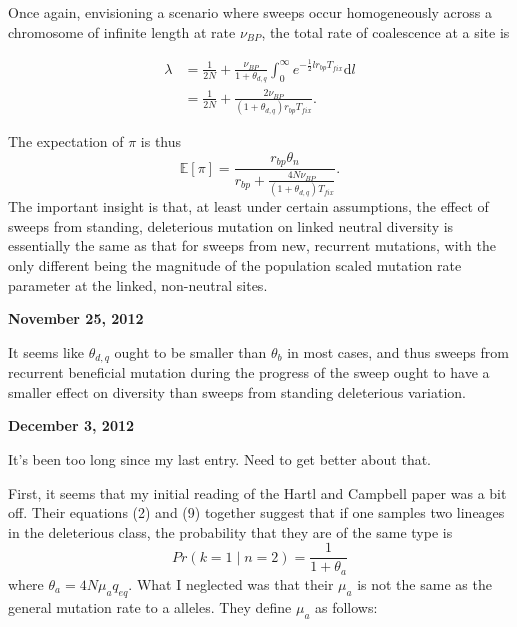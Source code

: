 \documentclass[reqno]{amsart}
\begin{document}
Once again, envisioning a scenario where sweeps occur homogeneously across a chromosome of infinite length at rate $\nu_{BP}$, the total rate of coalescence at a site is

\begin{align}
	\lambda &= \frac{1}{2N}+\frac{\nu_{BP}}{1+\theta_{d,q}}\int_0^\infty e^{-\frac{1}{2}lr_{bp}T_{fix}}\mathrm d l\\
	&= \frac{1}{2N} + \frac{2\nu_{BP}}{\left(1+\theta_{d,q}\right)r_{bp}T_{fix}}.
\end{align}

The expectation of $\pi$ is thus
\begin{equation}
	\mathbb{E}\left[\pi\right] = \frac{r_{bp}\theta_n}{r_{bp} + \frac{4N\nu_{BP}}{\left(1+\theta_{d,q}\right)T_{fix}}}.
\end{equation}
The important insight is that, at least under certain assumptions, the effect of sweeps from standing, deleterious mutation on linked neutral diversity is essentially the same as that for sweeps from new, recurrent mutations, with the only different being the magnitude of the population scaled mutation rate parameter at the linked, non-neutral sites.

\begin{flushright}
	\textbf{November 25, 2012}
\end{flushright}

It seems like $\theta_{d,q}$ ought to be smaller than $\theta_b$ in most cases, and thus sweeps from recurrent beneficial mutation during the progress of the sweep ought to have a smaller effect on diversity than sweeps from standing deleterious variation.

\begin{flushright}
	\textbf{December 3, 2012}
\end{flushright}

It's been too long since my last entry. Need to get better about that.

First, it seems that my initial reading of the Hartl and Campbell paper\cite{Hartl1982} was a bit off. Their equations (2) and (9) together suggest that if one samples two lineages in the deleterious class, the probability that they are of the same type is
\begin{equation}
	Pr(k=1\mid n = 2 ) = \frac{1}{1+\theta_a}
\end{equation}
where $\theta_a = 4N\mu_a q_{eq}$. What I neglected was that their $\mu_a$ is not the same as the general mutation rate to a alleles. They define $\mu_a$ as follows:
\end{document}
